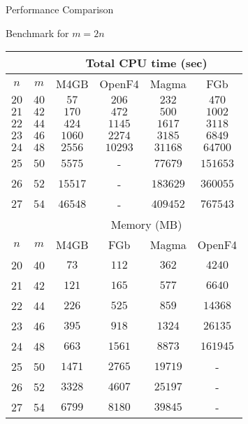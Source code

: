 \documentclass{beamer}
\begin{document}
\begin{section}{Performance Comparison}
  \begin{frame}{Benchmark for $m = 2n$}
    \vspace{-3mm}
    \begin{scriptsize}
      \begin{table}
        \begin{tabular}[h]{|c|c|c|c|c|c|}
          \hline
          \multicolumn{2}{|c|}{} &\multicolumn{4}{c|}{Total CPU time (sec)}\\
          \hline
          $n$ & $m$   & M4GB    & OpenF4  & Magma    & FGb      \\
          \hline
          $20$ & $40$ & $57$    & $206$   & $232$    & $470$    \\
          $21$ & $42$ & $170$   & $472$   & $500$    & $1002$   \\
          $22$ & $44$ & $424$   & $1145$  & $1617$   & $3118$   \\
          $23$ & $46$ & $1060$  & $2274$  & $3185$   & $6849$   \\
          $24$ & $48$ & $2556$  & $10293$ & $31168$  & $64700$  \\
          $25$ & $50$ & $5575$  & -       & $77679$  & $151653$ \\
          $26$ & $52$ & $15517$ & -       & $183629$ & $360055$ \\
          $27$ & $54$ & $46548$ & -       & $409452$ & $767543$ \\
          \hline\hline
          \multicolumn{2}{|c|}{} & \multicolumn{4}{c|}{Memory (MB)} \\
          \hline
          $n$ & $m$ & M4GB & FGb    & Magma   & OpenF4   \\
          \hline
          20 & 40 & $73$   & $112$  & $362$   & $4240$   \\
          21 & 42 & $121$  & $165$  & $577$   & $6640$   \\
          22 & 44 & $226$  & $525$  & $859$   & $14368$  \\
          23 & 46 & $395$  & $918$  & $1324$  & $26135$  \\
          24 & 48 & $663$  & $1561$ & $8873$  & $161945$ \\
          25 & 50 & $1471$ & $2765$ & $19719$ & -        \\
          26 & 52 & $3328$ & $4607$ & $25197$ & -        \\
          27 & 54 & $6799$ & $8180$ & $39845$ & -        \\
          \hline
        \end{tabular}
      \end{table}
    \end{scriptsize}
  \end{frame}


\end{section}
\end{document}
